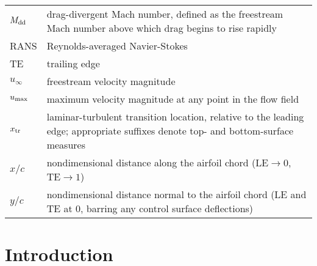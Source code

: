 \documentclass[conf]{new-aiaa}
\begin{document}
{\begin{longtable*}{@{}l @{\quad=\quad} p{5in}@{}}
                 $M_{\rm dd}$ & drag-divergent Mach number, defined as the freestream Mach number above which drag begins to rise rapidly \\
                 RANS & Reynolds-averaged Navier-Stokes \\
                 TE & trailing edge \\
                 $u_\infty$ & freestream velocity magnitude \\
                 $u_{\rm max}$ & maximum velocity magnitude at any point in the flow field \\
                 $x_{\rm tr}$ & laminar-turbulent transition location, relative to the leading edge; appropriate suffixes denote top- and bottom-surface measures \\
                 $x / c$ & nondimensional distance along the airfoil chord ($\text{LE} \rightarrow 0$, $\text{TE} \rightarrow 1$) \\
                 $y / c$ & nondimensional distance normal to the airfoil chord (LE and TE at 0, barring any control surface deflections) \\
    \end{longtable*}}


    \section{Introduction}
\end{document}
